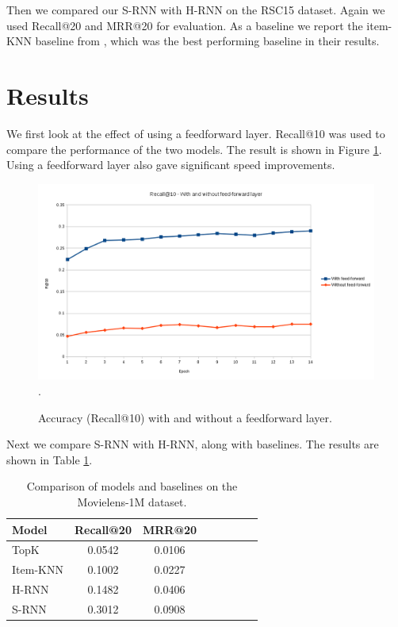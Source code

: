 Then we compared our S-RNN with H-RNN on the RSC15 dataset. Again we used Recall@20 and MRR@20 for evaluation. As a baseline we report the item-KNN baseline from \cite{DBLP:journals/corr/HidasiKBT15}, which was the best performing baseline in their results.

\section{Results}

We first look at the effect of using a feedforward layer. Recall@10 was used to compare the performance of the two models. The result is shown in Figure \ref{fig:ff-vs-non-ff}. Using a feedforward layer also gave significant speed improvements.

\begin{figure}[htp]
	\centering
	\includegraphics[width=1.0\textwidth]{fig/ff_vs_non-ff_chart.png}.
	\caption{Accuracy (Recall@10) with and without a feedforward layer.}
	\label{fig:ff-vs-non-ff}
\end{figure}

Next we compare S-RNN with H-RNN, along with baselines. The results are shown in Table \ref{table:movlen-comp}.

\begin{table}
	\centering
	\begin{tabular}{l*{6}{c}r}
		Model			& Recall@20	& MRR@20 \\
		\hline
		TopK			& 0.0542	& 0.0106 \\
		Item-KNN		& 0.1002	& 0.0227 \\
		H-RNN			& 0.1482	& 0.0406 \\
		S-RNN			& 0.3012	& 0.0908 \\
	\end{tabular}
	\caption{Comparison of models and baselines on the Movielens-1M dataset.}
	\label{table:movlen-comp}
\end{table}

